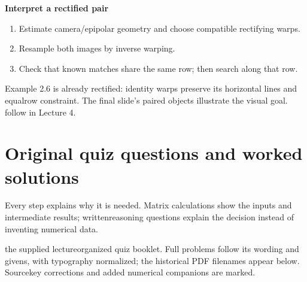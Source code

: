 \documentclass[letterpaper,11pt,english,openany,oneside]{jupyterBook}
\begin{document}
\begin{TextbookBox}
\textbf{Interpret a rectified pair}\par\smallskip
\begin{enumerate}
%
\item {}
\sphinxAtStartPar
Estimate camera/epipolar geometry and choose compatible rectifying warps.

\item {}
\sphinxAtStartPar
Resample both images by inverse warping.

\item {}
\sphinxAtStartPar
Check that known matches share the same row; then search along that row.

\end{enumerate}

\sphinxAtStartPar
Example 2.6 is already rectified: identity warps preserve its horizontal lines and equal\sphinxhyphen{}row constraint. The final slide’s paired objects illustrate the visual goal. {\hyperref[\detokenize{lectures/lecture04/stereo::doc}]{}} follow in Lecture 4.

\end{TextbookBox}

\ignorespaces
{}\ignorespaces
{}\ignorespaces
{}\ignorespaces
{}\ignorespaces
\sphinxstepscope


\section{Original quiz questions and worked solutions}
\label{\detokenize{lectures/lecture02/quiz-workbook:original-quiz-questions-and-worked-solutions}}\label{\detokenize{lectures/lecture02/quiz-workbook:lec02-quiz-workbook}}\label{\detokenize{lectures/lecture02/quiz-workbook::doc}}
\sphinxAtStartPar
{} Every step explains why it is needed. Matrix calculations show the inputs and intermediate results; written\sphinxhyphen{}reasoning questions explain the decision instead of inventing numerical data.

\sphinxAtStartPar
{} the supplied lecture\sphinxhyphen{}organized quiz booklet. Full problems follow its wording and givens, with typography normalized; the historical PDF filenames appear below. Source\sphinxhyphen{}key corrections and added numerical companions are marked.
\end{document}
